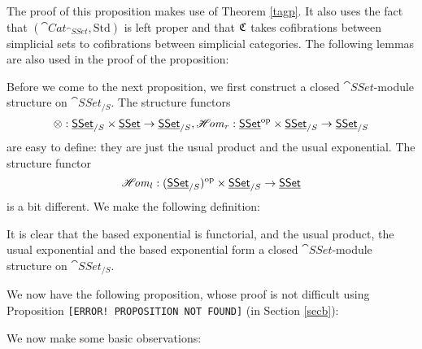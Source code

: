 The proof of this proposition makes use of Theorem \ref{tagp}.
It also uses the fact that $(\cat{Cat}_{\cat{SSet}},\text{Std})$ is left proper and that
$\mathfrak{C}$ takes cofibrations between simplicial sets to cofibrations between simplicial categories.
The following lemmas are also used in the proof of the proposition:



Before we come to the next proposition, we first construct a closed $\cat{SSet}$-module structure on $\cat{SSet}_{/S}$. 
The structure functors $$\otimes:\underline{\smash{\mathsf{SSet}}}_{/S}\times\underline{\smash{\mathsf{SSet}}}\to\underline{\smash{\mathsf{SSet}}}_{/S},\operatorname{\mathscr{H}\mkern-3mu\mathit{om}}_r:\underline{\smash{\mathsf{SSet}}}^{\mathrm{op}}\times\underline{\smash{\mathsf{SSet}}}_{/S}\to\underline{\smash{\mathsf{SSet}}}_{/S}$$
are easy to define: they are just the usual product and the usual exponential. The structure functor
$$\operatorname{\mathscr{H}\mkern-3mu\mathit{om}}_l:(\underline{\smash{\mathsf{SSet}}}_{/S})^{\mathrm{op}}\times\underline{\smash{\mathsf{SSet}}}_{/S}\to\underline{\smash{\mathsf{SSet}}}$$ is a bit different. We make the following definition:


It is clear that the based exponential is functorial, and the usual product, the usual exponential and the based exponential
form a closed $\cat{SSet}$-module structure on $\cat{SSet}_{/S}$. 

We now have the following proposition, whose proof is not difficult using Proposition 
{\color{FF0000}\texttt{[ERROR! PROPOSITION NOT FOUND]}} (in Section \ref{secb}):


We now make some basic observations:


